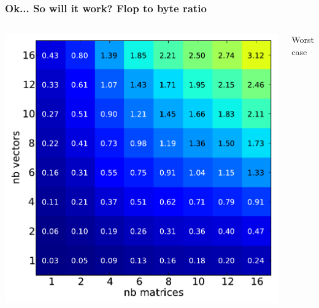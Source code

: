 \documentclass{beamer}
\begin{document}
\begin{frame}
  \frametitle{Ok... So will it work? Flop to byte ratio}

  \begin{columns}
    \includegraphics[width=\linewidth]{slides-figures/ICS-figures/flops_to_bytes_worst-crop.pdf}
    \begin{center}
      Worst case\\~
    \end{center}


\end{columns}
\end{frame}
\end{document}
